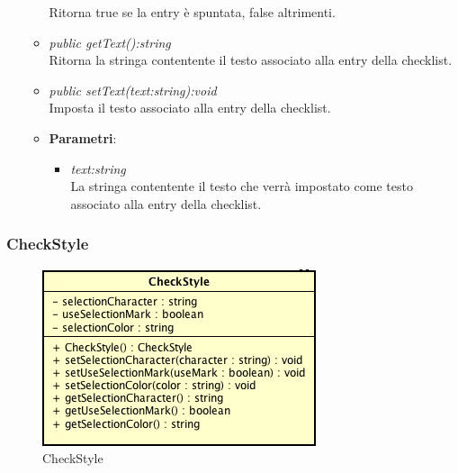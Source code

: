 \begin{itemize}
\begin{itemize}
	Ritorna true se la entry è spuntata, false altrimenti.
	\item \textit{public getText():string}\\
	Ritorna la stringa contentente il testo associato alla entry della checklist.
	\item \textit{public setText(text:string):void}\\
	Imposta il testo associato alla entry della checklist.
		\item{\textbf{Parametri}: \begin{itemize}
		\item \textit{text:string}\\
		La stringa contentente il testo che verrà impostato come testo associato alla entry della checklist.
		\end{itemize}}
	\end{itemize}
\end{itemize}

\subsubsection{CheckStyle}

\label{CheckStyle}
\begin{figure}[ht]
	\centering
	\includegraphics[scale=0.5]{Sezioni/SottosezioniST/img/CheckStyle.png}
	\caption{CheckStyle}
\end{figure}

